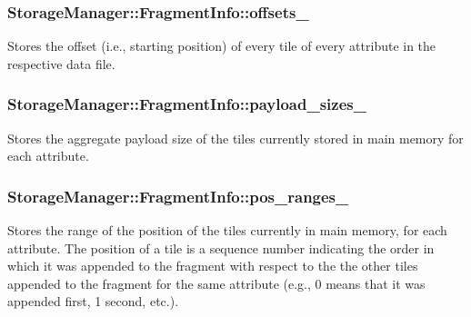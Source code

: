 \subsubsection[{offsets\+\_\+}]{ Storage\+Manager\+::\+Fragment\+Info\+::offsets\+\_\+}\label{structStorageManager_1_1FragmentInfo_a676e54c719212948c1e58ce5b1d01a0d}
Stores the offset (i.\+e., starting position) of every tile of every attribute in the respective data file. \hypertarget{structStorageManager_1_1FragmentInfo_a733686e314b164d8feb9a450d94d7493}{}
\subsubsection[{payload\+\_\+sizes\+\_\+}]{ Storage\+Manager\+::\+Fragment\+Info\+::payload\+\_\+sizes\+\_\+}\label{structStorageManager_1_1FragmentInfo_a733686e314b164d8feb9a450d94d7493}
Stores the aggregate payload size of the tiles currently stored in main memory for each attribute. \hypertarget{structStorageManager_1_1FragmentInfo_a62cdc24ff855fca25e44149ac06f1750}{}
\subsubsection[{pos\+\_\+ranges\+\_\+}]{ Storage\+Manager\+::\+Fragment\+Info\+::pos\+\_\+ranges\+\_\+}\label{structStorageManager_1_1FragmentInfo_a62cdc24ff855fca25e44149ac06f1750}
Stores the range of the position of the tiles currently in main memory, for each attribute. The position of a tile is a sequence number indicating the order in which it was appended to the fragment with respect to the the other tiles appended to the fragment for the same attribute (e.\+g., 0 means that it was appended first, 1 second, etc.). \hypertarget{structStorageManager_1_1FragmentInfo_a218cabe8c985b3d51a71b1a09946f766}{}
